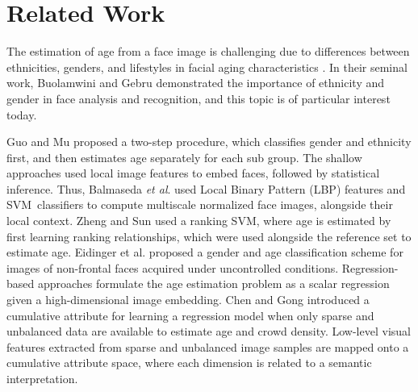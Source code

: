 \documentclass[10pt,journal]{IEEEtran}\usepackage{amsfonts}
\begin{document}
\section{Related Work}

\label{sec:Related Work}

The estimation of age from a face image is challenging due to differences
between ethnicities, genders, and lifestyles in facial aging characteristics
\cite{6920084}. In their seminal work, Buolamwini and Gebru
\cite{Gebru} demonstrated the importance of ethnicity and gender in face
analysis and recognition, and this topic is of particular interest today.

Guo and Mu \cite{guo2010human} proposed a two-step procedure, which
classifies gender and ethnicity first, and then estimates age separately for
each sub group. The shallow approaches used local image features to embed
faces, followed by statistical inference. Thus, Balmaseda \emph{et al}.
\cite{ramon2012gender} used Local Binary Pattern (LBP) features and
SVM\ classifiers to compute multiscale normalized face images, alongside their
local context. Zheng and Sun \cite{ZhengSun2012} used a ranking SVM, where age
is estimated by first learning ranking relationships, which were used
alongside the reference set to estimate age. Eidinger et al.
\cite{eidinger2014age} proposed a gender and age classification scheme for
images of non-frontal faces acquired under uncontrolled conditions.
Regression-based approaches formulate the age estimation problem as a scalar
regression given a high-dimensional image embedding. Chen and Gong
\cite{ChenGong2013} introduced a cumulative attribute for learning a
regression model when only sparse and unbalanced data are available to
estimate age and crowd density. Low-level visual features extracted from
sparse and unbalanced image samples are mapped onto a cumulative attribute
space, where each dimension is related to a semantic interpretation.
\end{document}

